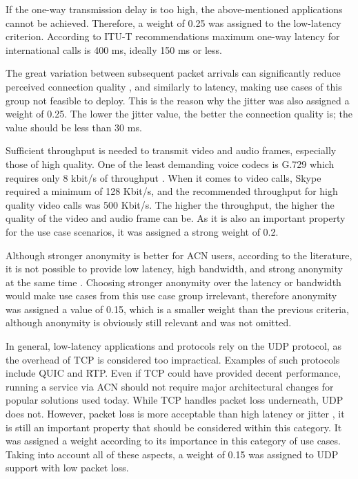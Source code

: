 If the one-way transmission delay is too high, the above-mentioned applications cannot be achieved. Therefore, a weight of 0.25 was assigned to the low-latency criterion. According to ITU-T recommendations \cite{ITU-G.114} maximum one-way latency for international calls is 400 ms, ideally 150 ms or less.

The great variation between subsequent packet arrivals can significantly reduce perceived connection quality \cite{voip-tor}, and similarly to latency,  making use cases of this group not feasible to deploy. This is the reason why the jitter was also assigned a weight of 0.25. The lower the jitter value, the better the connection quality is; the value should be less than 30 ms.

Sufficient throughput is needed to transmit video and audio frames, especially those of high quality. One of the least demanding voice codecs is G.729 which requires only 8 kbit/s of throughput \cite{ITU-G.729}. When it comes to video calls, Skype required \cite{microsoft-skype-bandwidth} a minimum of 128 Kbit/s, and the recommended throughput for high quality video calls was 500 Kbit/s. The higher the throughput, the higher the quality of the video and audio frame can be. As it is also an important property for the use case scenarios, it was assigned a strong weight of 0.2.

Although stronger anonymity is better for ACN users, according to the literature, it is not possible to provide low latency, high bandwidth, and strong anonymity at the same time \cite{anonymity-trillema}. Choosing stronger anonymity over the latency or bandwidth would make use cases from this use case group irrelevant, therefore anonymity was assigned a value of 0.15, which is a smaller weight than the previous criteria, although anonymity is obviously still relevant and was not omitted.

In general, low-latency applications and protocols rely on the UDP protocol, as the overhead of TCP is considered too impractical. Examples of such protocols include QUIC and RTP. Even if TCP could have provided decent performance, running a service via ACN should not require major architectural changes for popular solutions used today. While TCP handles packet loss underneath, UDP does not. However, packet loss is more acceptable than high latency or jitter \cite{voip-tor}, it is still an important property that should be considered within this category. It was assigned a weight according to its importance in this category of use cases.  Taking into account all of these aspects, a weight of 0.15 was assigned to UDP support with low packet loss.

